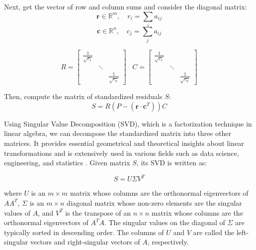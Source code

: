 Next, get the vector of row and column sums and consider the diagonal matrix:
\begin{equation}
\textbf{r} \in \mathbb{R}^m, \quad  r_i = \sum_{i} a_{ij}
\end{equation}
\begin{equation}
\textbf{c} \in \mathbb{R}^n , \quad c_j = \sum_{j} a_{ij} 
\end{equation}





\begin{equation}
  R =
  \begin{bmatrix}
    \frac{1}{{\sqrt{r_{1}}}} & & \\
    & \ddots & \\
    & & \frac{1}{{\sqrt{r_{n}}}}
  \end{bmatrix}
  \;\;\;  C =
  \begin{bmatrix}
    \frac{1}{{\sqrt{c_{1}}}} & & \\
    & \ddots & \\
    & & \frac{1}{{\sqrt{c_{n}}}}
  \end{bmatrix}
\end{equation}

Then, compute the matrix of standardized residuals $S$:
\begin{equation}
S = R\left(P - (\textbf{r}\cdot \textbf{c}^T)\right)C
\end{equation}

Using Singular Value Decomposition (SVD), which is a factorization technique in linear algebra, we can decompose the standardized matrix into three other matrices. It provides essential geometrical and theoretical insights about linear transformations and is extensively used in various fields such as data science, engineering, and statistics \cite{golub1970singular}. Given  matrix $S$, its SVD is  written as:

\begin{equation}
S = U\Sigma V^T
\end{equation}

where $U$ is an $m \times m$ matrix whose columns are the orthonormal eigenvectors of $AA^T$, $\Sigma$ is an $m \times n$ diagonal matrix whose non-zero elements are the singular values of $A$, and $V^T$ is the transpose of an $n \times n$ matrix whose columns are the orthonormal eigenvectors of $A^T A$. The singular values on the diagonal of $\Sigma$ are typically sorted in descending order. The columns of $U$ and $V$ are called the left-singular vectors and right-singular vectors of $A$, respectively.
\\

